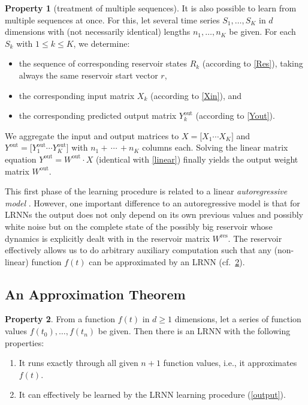 \documentclass[twoside,11pt]{article}
\theoremstyle{definition}
\newtheorem{prop}{Property}
\begin{document}
\begin{prop}[treatment of multiple sequences]\label{multi}
It is also possible to learn from multiple sequences at once. For this, let
several time series $S_1,\dots,S_K$ in $d$ dimensions with (not necessarily
identical) lengths $n_1,\dots,n_K$ be given. For each $S_k$ with $1 \le k \le
K$, we determine:
\begin{itemize}
  \item the sequence of corresponding reservoir states $R_k$ (according to
	\cref{Res}), taking always the same reservoir start vector $r$,
  \item the corresponding input matrix $X_k$ (according to \cref{Xin}), and
  \item the corresponding predicted output matrix $Y^\mathrm{out}_k$ (according to \cref{Yout}).
\end{itemize}
We aggregate the input and output matrices to $X = \big[ X_1 \cdots X_K \big]$
and $Y^\mathrm{out} = \big[ Y^\mathrm{out}_1 \cdots Y^\mathrm{out}_K \big]$ with
$n_1+\,\cdots\,+n_K$ columns each. Solving the linear matrix equation
$Y^\mathrm{out} = W^\mathrm{out} \cdot X$ (identical with \cref{linear})
finally yields the output weight matrix $W^\mathrm{out}$.
\end{prop}

This first phase of the learning procedure is related to a linear
\emph{autoregressive model} \citep{Aka69}. However, one important
difference to an autoregressive model is that for LRNNs the output does not only
depend on its own previous values and possibly white noise but on the complete
state of the possibly big reservoir whose dynamics is explicitly dealt with in
the reservoir matrix $W^\mathrm{res}$. The reservoir effectively allows us to do
arbitrary auxiliary computation such that any (non-linear) function $f(t)$ can
be approximated by an LRNN (cf.~\cref{approx}).

\subsection{An Approximation Theorem}

\begin{prop}\label{approx}
From a function $f(t)$ in $d \ge 1$ dimensions, let a
series of function values $f(t_0),\dots,f(t_n)$ be given. Then there is an
LRNN with the following properties:
\begin{enumerate}
  \item It runs exactly through all given $n+1$ function values, i.e., it approximates $f(t)$.
  \item It can effectively be learned by the LRNN learning procedure (\cref{output}).
\end{enumerate}
\end{prop}
\end{document}
